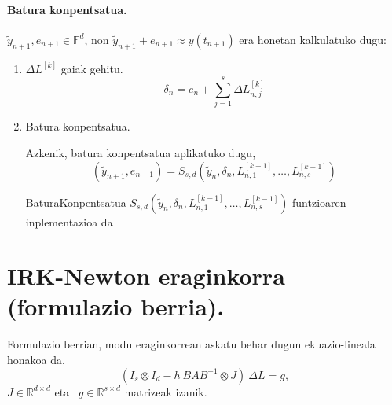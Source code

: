 \paragraph*{Batura konpentsatua.}

$\tilde{y}_{n+1}, e_{n+1} \in \mathbb{F}^d$, non $\tilde{y}_{n+1}+e_{n+1}\approx y(t_{n+1})$ era honetan kalkulatuko dugu:
\begin{enumerate}

\item $\Delta L^{[k]}$ gaiak gehitu.
\begin{equation*}
\delta_{n}={e}_{n} + \sum\limits_{j=1}^{s}\Delta L_{n,j}^{[k]}
\end{equation*}

\item Batura konpentsatua.

Azkenik, batura konpentsatua aplikatuko dugu,
\begin{equation}
\label{eq:bkLi2}
(\tilde y_{n+1}, e_{n+1}) = S_{s,d}(\tilde y_n, \delta_n, L_{n,1}^{[k-1]}, \dots,L_{n,s}^{[k-1]})
\end{equation}
 
\begin{algorithm}[H]
  \SetAlgoLined\DontPrintSemicolon
  \caption{BaturaKonpentsatua $S_{s,d}(\tilde y_n, \delta_n, L_{n,1}^{[k-1]}, \dots,L_{n,s}^{[k-1]})$ funtzioaren inplementazioa da}
\end{algorithm} 

\end{enumerate}

\section{IRK-Newton eraginkorra (formulazio berria).}
\label{sec:7.5}

Formulazio berrian, modu eraginkorrean askatu behar dugun ekuazio-lineala honakoa da, 
\begin{equation}
\label{eq:linsysZG}
(I_s \otimes I_d - h \ BAB^{-1} \otimes J) \ \Delta L = g, 
\end{equation}
$J \in \mathbb{R}^{d \times d}$  eta ~$g \in \mathbb{R}^{s \times d}$ matrizeak izanik. 

